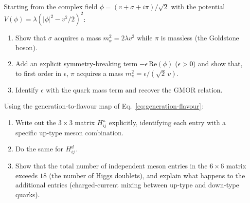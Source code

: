 \documentclass[11pt,a4paper]{article}
\begin{document}
\begin{exercise}
\label{ex:sigma-model}
Starting from the complex field $\phi = (v + \sigma + i\pi)/\sqrt{2}$
with the potential
$V(\phi) = \lambda(|\phi|^2 - v^2/2)^2$:
\begin{enumerate}[label=(\alph*)]
  \item Show that $\sigma$ acquires a mass $m_\sigma^2 = 2\lambda v^2$
    while $\pi$ is massless (the Goldstone boson).
  \item Add an explicit symmetry-breaking term $-\epsilon\,\text{Re}(\phi)$
    ($\epsilon > 0$) and show that, to first order in $\epsilon$, $\pi$
    acquires a mass $m_\pi^2 = \epsilon/(\sqrt{2}\,v)$.
  \item Identify $\epsilon$ with the quark mass term and recover the
    GMOR relation.
\end{enumerate}
\end{exercise}

\begin{exercise}
\label{ex:higgs-meson}
Using the generation-to-flavour map of
Eq.~\eqref{eq:generation-flavour}:
\begin{enumerate}[label=(\alph*)]
  \item Write out the $3 \times 3$ matrix $H_{ij}^u$ explicitly,
    identifying each entry with a specific up-type meson combination.
  \item Do the same for $H_{ij}^d$.
  \item Show that the total number of independent meson entries in the
    $6 \times 6$ matrix exceeds $18$ (the number of Higgs doublets),
    and explain what happens to the additional entries (charged-current
    mixing between up-type and down-type quarks).
\end{enumerate}
\end{exercise}
\end{document}
